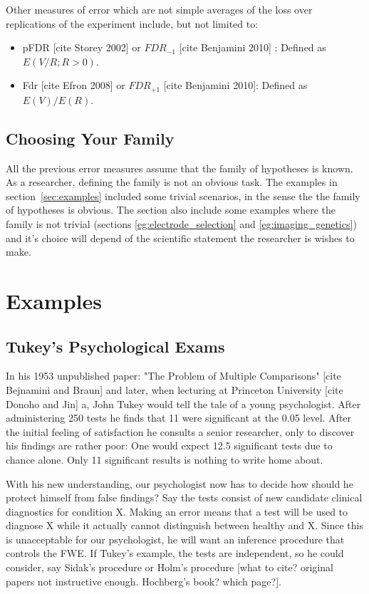 \documentclass[draft,12pt]{article}
\begin{document}
Other measures of error which are not simple averages of the loss over replications of the experiment include, but not limited to:
\begin{itemize}
\item pFDR [cite Storey 2002] or $FDR_{-1}$ [cite Benjamini 2010] : Defined as $E(V/R;R>0)$.
\item Fdr [cite Efron 2008] or $FDR_{+1}$ [cite Benjamini 2010]: Defined as $E(V)/E(R)$.
\end{itemize}




\subsection{Choosing Your Family}
All the previous error measures assume that the family of hypotheses is known. As a researcher, defining the family is not an obvious task. The examples in section~\ref{sec:examples} included some trivial scenarios, in the sense the the family of hypotheses is obvious. The section also include some examples where the family is not trivial (sections \ref{eg:electrode_selection} and \ref{eg:imaging_genetics}) and it's choice will depend of the scientific statement the researcher is wishes to make.




\section{\label{sec:examples}Examples}



\subsection{Tukey's Psychological Exams}
In his 1953 unpublished paper: "The Problem of Multiple Comparisons" [cite Bejnamini and Braun] and later, when lecturing at Princeton University [cite Donoho and Jin] a, John Tukey would tell the tale of a young psychologist. After administering 250 tests he finds that 11 were significant at the 0.05 level. After the initial feeling of satisfaction he consults a senior researcher, only to discover his findings are rather poor: One would expect 12.5 significant tests due to chance alone. Only 11 significant results is nothing to write home about.


With his new understanding, our psychologist now has to decide how should he protect himself from false findings? 
Say the tests consist of new candidate clinical diagnostics for condition X. Making an error means that a test will be used to diagnose X while it actually cannot distinguish between healthy and X. Since this is unacceptable for our psychologist, he will want an inference procedure that controls the FWE. If Tukey's example, the tests are independent, so he could consider, say Sidak's procedure or Holm's procedure [what to cite? original papers not instructive enough. Hochberg's book? which page?].
\end{document}

